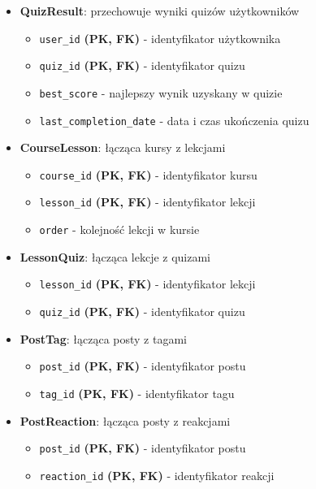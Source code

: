 \documentclass[11pt,a4paper]{article}
\numberwithin{equation}{section}
\begin{document}
\begin{itemize}
    \item \textbf{QuizResult}: przechowuje wyniki quizów użytkowników
        \begin{itemize}
            \item \texttt{user\_id} \textbf{(PK, FK)} - identyfikator użytkownika
            \item \texttt{quiz\_id} \textbf{(PK, FK)} - identyfikator quizu
            \item \texttt{best\_score} - najlepszy wynik uzyskany w quizie
            \item \texttt{last\_completion\_date} - data i czas ukończenia quizu
        \end{itemize}
    \item \textbf{CourseLesson}: łącząca kursy z lekcjami
        \begin{itemize}
            \item \texttt{course\_id} \textbf{(PK, FK)} - identyfikator kursu
            \item \texttt{lesson\_id} \textbf{(PK, FK)} - identyfikator lekcji
            \item \texttt{order} - kolejność lekcji w kursie
        \end{itemize}
    \item \textbf{LessonQuiz}: łącząca lekcje z quizami
        \begin{itemize}
            \item \texttt{lesson\_id} \textbf{(PK, FK)} - identyfikator lekcji
            \item \texttt{quiz\_id} \textbf{(PK, FK)} - identyfikator quizu
        \end{itemize}
    \item \textbf{PostTag}: łącząca posty z tagami
        \begin{itemize}
            \item \texttt{post\_id} \textbf{(PK, FK)} - identyfikator postu
            \item \texttt{tag\_id} \textbf{(PK, FK)} - identyfikator tagu
        \end{itemize}
    \item \textbf{PostReaction}: łącząca posty z reakcjami
        \begin{itemize}
            \item \texttt{post\_id} \textbf{(PK, FK)} - identyfikator postu
            \item \texttt{reaction\_id} \textbf{(PK, FK)} - identyfikator reakcji

\end{itemize}
\end{itemize}
\end{document}

